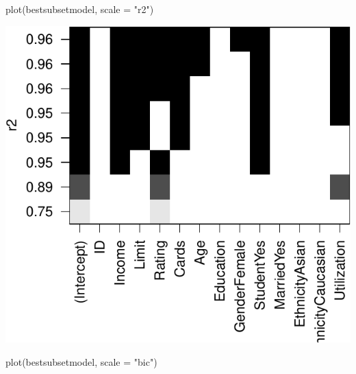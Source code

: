 \documentclass[
]{article}
\newenvironment{Shaded}{\begin{snugshade}}{\end{snugshade}}
\newcommand{\AttributeTok}[1]{\textcolor[rgb]{0.77,0.63,0.00}{#1}}
\newcommand{\FunctionTok}[1]{\textcolor[rgb]{0.00,0.00,0.00}{#1}}
\newcommand{\NormalTok}[1]{#1}
\newcommand{\StringTok}[1]{\textcolor[rgb]{0.31,0.60,0.02}{#1}}
\begin{document}
\begin{Shaded}
\begin{Highlighting}[]
\FunctionTok{plot}\NormalTok{(bestsubsetmodel, }\AttributeTok{scale =} \StringTok{"r2"}\NormalTok{)}
\end{Highlighting}
\end{Shaded}

\begin{center}\includegraphics{SDM-CHAP24_files/figure-latex/unnamed-chunk-6-3} \end{center}

\begin{Shaded}
\begin{Highlighting}[]
\FunctionTok{plot}\NormalTok{(bestsubsetmodel, }\AttributeTok{scale =} \StringTok{"bic"}\NormalTok{)}
\end{Highlighting}
\end{Shaded}
\end{document}
